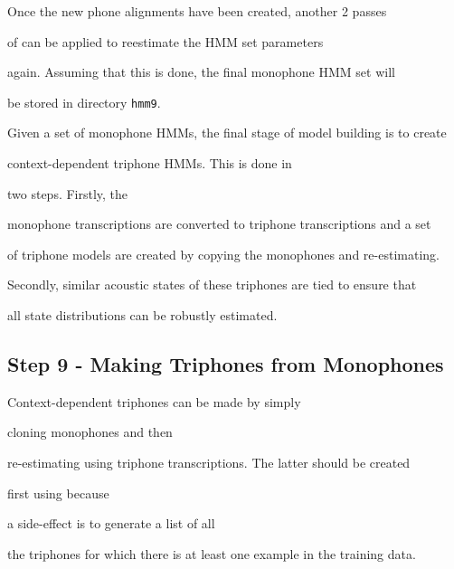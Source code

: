 




Once the new phone alignments have been created, another  2 passes


of  can be applied to reestimate the HMM set parameters


again.  Assuming that this is done, the final monophone HMM set will


be stored in directory \texttt{hmm9}.










Given a set of monophone HMMs, the final stage of model building is to create


context-dependent triphone HMMs.  This is done in 


two steps.  Firstly, the


monophone transcriptions are converted to triphone transcriptions and a set


of triphone models are created by copying the monophones and re-estimating.


Secondly, similar acoustic states of these triphones are tied to ensure that


all state distributions can be robustly estimated.





\subsection{Step 9 - Making Triphones from Monophones}





Context-dependent triphones can be made by simply 


cloning monophones and then


re-estimating using triphone transcriptions.  The latter should be created


first using  because 


a side-effect is to generate a list of all


the triphones for which there is at least one example in the training data.


